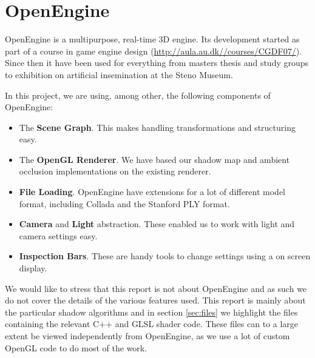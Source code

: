 \section{OpenEngine}

OpenEngine is a multipurpose, real-time 3D engine. Its development
started as part of a course in game engine design
(\url{http://aula.au.dk//courses/CGDF07/}). Since then it have been
used for everything from masters thesis and study groups to exhibition
on artificial insemination at the Steno Museum.

In this project, we are using, among other, the following components
of OpenEngine:

\begin{itemize}
\item The \textbf{Scene Graph}. This makes handling transformations
  and structuring easy.
\item The \textbf{OpenGL Renderer}. We have based our shadow map and
  ambient occlusion implementations on the existing renderer.
\item \textbf{File Loading}. OpenEngine have extensions for a lot of
  different model format, including Collada and the Stanford PLY format.
\item \textbf{Camera} and \textbf{Light} abstraction. These enabled us
  to work with light and camera settings easy.
\item \textbf{Inspection Bars}. These are handy tools to change
  settings using a on screen display.
\end{itemize}

We would like to stress that this report is not about OpenEngine and
as such we do not cover the details of the various features used. This
report is mainly about the particular shadow algorithms and in
section \ref{sec:files} we highlight the files containing the relevant
C++ and GLSL shader code. These files can to a large extent be viewed
independently from OpenEngine, as we use a lot of custom OpenGL code to
do most of the work.

